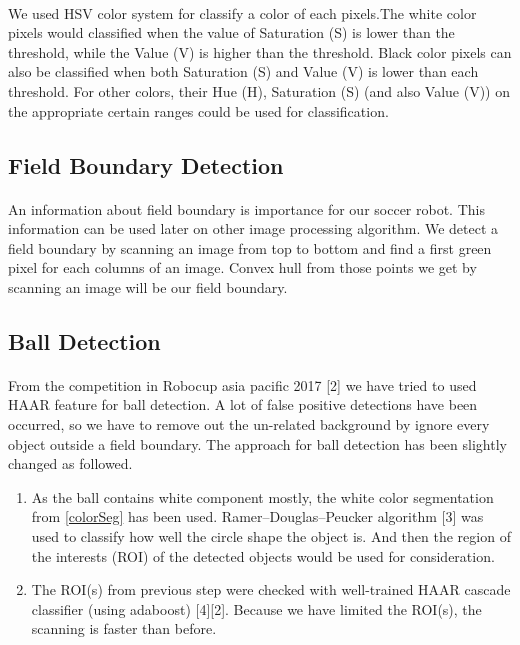 	\paragraph{}
	We used HSV color system for classify a color of each pixels.The white color pixels would classified when the value of Saturation (S) is lower than the threshold, while the Value (V) is higher than the threshold. Black color pixels can also be classified when both Saturation (S) and Value (V) is lower than each threshold. For other colors, their Hue (H), Saturation (S) (and also Value (V)) on the appropriate certain ranges could be used for classification.
	
	\subsection{Field Boundary Detection}
	\paragraph{}
	An information about field boundary is importance for our soccer robot. This information can be used later on other image processing algorithm. We detect a field boundary by scanning an image from top to bottom and find a first green pixel for each columns of an image. Convex hull from those points we get by scanning an image will be our field boundary. 
	
	\subsection{Ball Detection}
	\paragraph{}
	From the competition in Robocup asia pacific 2017 [2] we have tried to used HAAR feature for ball detection. A lot of false positive detections have been occurred, so we have to remove out the un-related background by ignore every object outside a field boundary. The approach for ball detection has been slightly changed as followed.
	\begin{enumerate}
		\item As the ball contains white component mostly, the white color segmentation from \ref{colorSeg} has been used. Ramer–Douglas–Peucker algorithm [3] was used to classify how well the circle shape the object is. And then the region of the interests (ROI) of the detected objects would be used for consideration.
		
		\item The ROI(s) from previous step were checked with well-trained HAAR cascade classifier (using adaboost) [4][2].  Because we have limited the ROI(s), the scanning is faster than before. 
	\end{enumerate}
	
